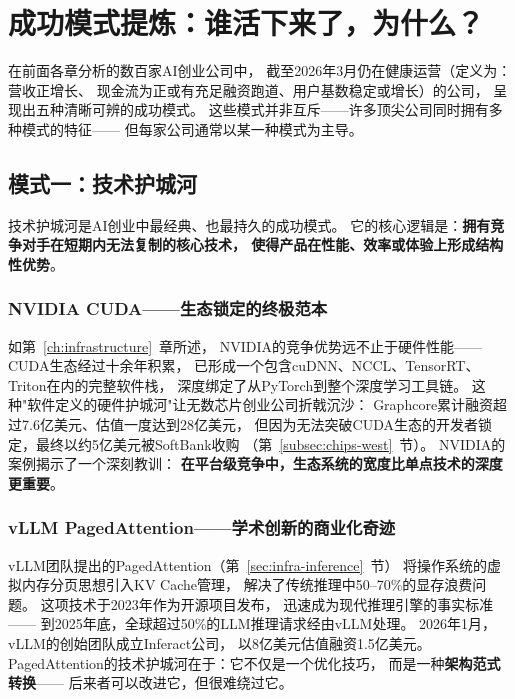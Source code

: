 \section{成功模式提炼：谁活下来了，为什么？}
\label{sec:patterns-success}

在前面各章分析的数百家AI创业公司中，
截至2026年3月仍在健康运营（定义为：营收正增长、
现金流为正或有充足融资跑道、用户基数稳定或增长）的公司，
呈现出五种清晰可辨的成功模式。
这些模式并非互斥——许多顶尖公司同时拥有多种模式的特征——
但每家公司通常以某一种模式为主导。

\subsection{模式一：技术护城河}

技术护城河是AI创业中最经典、也最持久的成功模式。
它的核心逻辑是：\textbf{拥有竞争对手在短期内无法复制的核心技术，
使得产品在性能、效率或体验上形成结构性优势}。

\subsubsection{NVIDIA CUDA——生态锁定的终极范本}
如第~\ref{ch:infrastructure}~章所述，
NVIDIA的竞争优势远不止于硬件性能——CUDA生态经过十余年积累，
已形成一个包含cuDNN、NCCL、TensorRT、Triton在内的完整软件栈，
深度绑定了从PyTorch到整个深度学习工具链。
这种"软件定义的硬件护城河"让无数芯片创业公司折戟沉沙：
Graphcore累计融资超过7.6亿美元、估值一度达到28亿美元，
但因为无法突破CUDA生态的开发者锁定，最终以约5亿美元被SoftBank收购
（第~\ref{subsec:chips-west}~节）。
NVIDIA的案例揭示了一个深刻教训：
\textbf{在平台级竞争中，生态系统的宽度比单点技术的深度更重要}。

\subsubsection{vLLM PagedAttention——学术创新的商业化奇迹}
vLLM团队提出的PagedAttention（第~\ref{sec:infra-inference}~节）
将操作系统的虚拟内存分页思想引入KV Cache管理，
解决了传统推理中50--70\%的显存浪费问题。
这项技术于2023年作为开源项目发布，
迅速成为现代推理引擎的事实标准——
到2025年底，全球超过50\%的LLM推理请求经由vLLM处理。
2026年1月，vLLM的创始团队成立Inferact公司，
以8亿美元估值融资1.5亿美元。
PagedAttention的技术护城河在于：它不仅是一个优化技巧，
而是一种\textbf{架构范式转换}——
后来者可以改进它，但很难绕过它。

